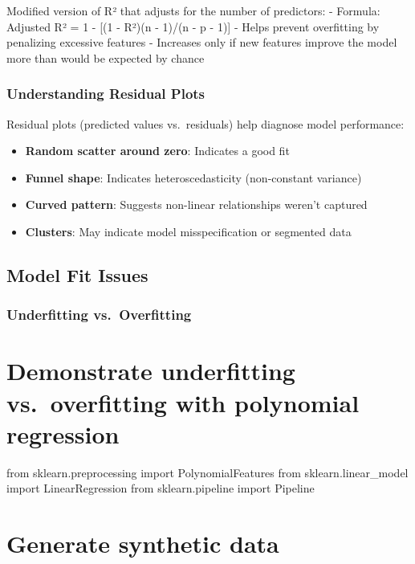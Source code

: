 \documentclass[
  letterpaper,
  DIV=11,
  numbers=noendperiod]{scrreprt}
\providecommand{\tightlist}{%
  \setlength{\itemsep}{0pt}\setlength{\parskip}{0pt}}\usepackage{longtable,booktabs,array}
\begin{document}
Modified version of R² that adjusts for the number of predictors: -
Formula: Adjusted R² = 1 - {[}(1 - R²)(n - 1)/(n - p - 1){]} - Helps
prevent overfitting by penalizing excessive features - Increases only if
new features improve the model more than would be expected by chance

\subsection{Understanding Residual
Plots}\label{understanding-residual-plots}

Residual plots (predicted values vs.~residuals) help diagnose model
performance:

\begin{itemize}
\tightlist
\item
  \textbf{Random scatter around zero}: Indicates a good fit
\item
  \textbf{Funnel shape}: Indicates heteroscedasticity (non-constant
  variance)
\item
  \textbf{Curved pattern}: Suggests non-linear relationships weren't
  captured
\item
  \textbf{Clusters}: May indicate model misspecification or segmented
  data
\end{itemize}

\section{Model Fit Issues}\label{model-fit-issues}

\subsection{Underfitting
vs.~Overfitting}\label{underfitting-vs.-overfitting}


\chapter{Demonstrate underfitting vs.~overfitting with polynomial
regression}\label{demonstrate-underfitting-vs.-overfitting-with-polynomial-regression}

from sklearn.preprocessing import PolynomialFeatures from
sklearn.linear\_model import LinearRegression from sklearn.pipeline
import Pipeline


\chapter{Generate synthetic data}\label{generate-synthetic-data}
\end{document}
